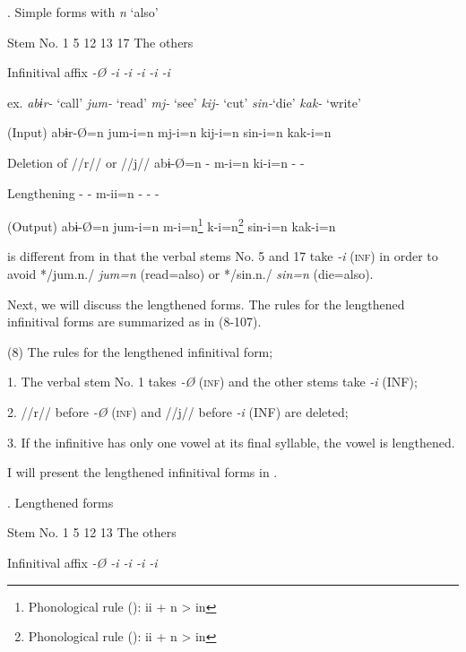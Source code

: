 \begin{styleBeschriftung}
\textmd{}\textmd{. Simple forms with} \textmd{\textit{n} }\textmd{‘also’}
\end{styleBeschriftung}

Stem No.  1  5  12  13  17  The others

Infinitival affix  \textit{{}-Ø  {}-i  {}-i  {}-i  {}-i  {}-i}

ex.  \textit{abɨr-} ‘call’  \textit{jum-} ‘read’  \textit{mj-} ‘see’  \textit{kij-} ‘cut’  \textit{sin-}‘die’  \textit{kak-} ‘write’

(Input)  abɨr-Ø=n  jum-i=n  mj-i=n  kij-i=n  sin-i=n  kak-i=n

Deletion of //r// or //j//  abɨ-Ø=n  {}-  m-i=n  ki-i=n  {}-  {}-

Lengthening  {}-  {}-  m-ii=n  {}-  {}-  {}-

(Output)  abɨ-Ø=n  jum-i=n  m-i=n\footnote{Phonological rule (): ii + n > in}  k-i=n\footnote{Phonological rule (): ii + n > in}  sin-i=n  kak-i=n

 is different from  in that the verbal stems No. 5 and 17 take \textit{{}-i} (\textsc{inf}) in order to avoid */jum.n./ \textit{jum=n} (read=also) or */sin.n./ \textit{sin=n} (die=also).

  Next, we will discuss the lengthened forms. The rules for the lengthened infinitival forms are summarized as in (8-107).

(8)  The rules for the lengthened infinitival form;

  1.  The verbal stem No. 1 takes \textit{{}-Ø} (\textsc{inf}) and the other stems take \textit{{}-i} (INF);

  2.  //r// before \textit{{}-Ø} (\textsc{inf}) and //j// before \textit{{}-i} (INF) are deleted;

  3.  If the infinitive has only one vowel at its final syllable, the vowel is lengthened.

I will present the lengthened infinitival forms in .

\begin{styleBeschriftung}
\textmd{}\textmd{. Lengthened forms}
\end{styleBeschriftung}

Stem No.  1  5  12  13  The others

Infinitival affix  \textit{{}-Ø  {}-i  {}-i  {}-i  {}-i}


